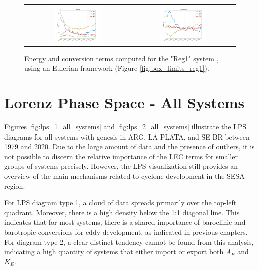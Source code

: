 \begin{figure}[!htbp]
\centering
\begin{tabular}{cc}
\includegraphics[width=0.46\textwidth]{figs_appendix/timeseires_energy.png} & 
\includegraphics[width=0.46\textwidth]{figs_appendix/timeseires_conversion.png} \\
\end{tabular}
\caption[Energy and Conversion Terms - Reg1 System]{Energy and conversion terms computed for the "Reg1" system \citep{dias2011energy}, using an Eulerian framework (Figure \ref{fig:box_limits_reg1}).}
\label{fig:energy_conversion_timeseries_reg1}
\end{figure}

\chapter{Lorenz Phase Space - All Systems}\label{ap:06}

Figures \ref{fig:lps_1_all_systems} and \ref{fig:lps_2_all_systems} illustrate the LPS diagrams for all systems with genesis in ARG, LA-PLATA, and SE-BR between 1979 and 2020. Due to the large amount of data and the presence of outliers, it is not possible to discern the relative importance of the LEC terms for smaller groups of systems precisely. However, the LPS visualization still provides an overview of the main mechanisms related to cyclone development in the SESA region.

For LPS diagram type 1, a cloud of data spreads primarily over the top-left quadrant. Moreover, there is a high density below the 1:1 diagonal line. This indicates that for most systems, there is a shared importance of baroclinic and barotropic conversions for eddy development, as indicated in previous chapters. For diagram type 2, a clear distinct tendency cannot be found from this analysis, indicating a high quantity of systems that either import or export both $A_E$ and $K_E$.


